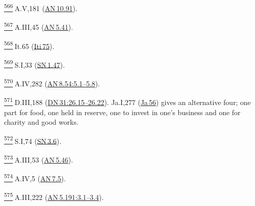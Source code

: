\label{footprints_split_025.html_fn566}
\hyperref[footprints_split_015.htmlux5cux23fnref566]{\textsuperscript{566}} A.V,181
(\href{https://suttacentral.net/an10.91/en/sujato}{AN\,10.91}).

\label{footprints_split_025.html_fn567}
\hyperref[footprints_split_015.htmlux5cux23fnref567]{\textsuperscript{567}} A.III,45
(\href{https://suttacentral.net/an5.41/en/sujato}{AN\,5.41}).

\label{footprints_split_025.html_fn568}
\hyperref[footprints_split_015.htmlux5cux23fnref568]{\textsuperscript{568}} It.65
(\href{https://suttacentral.net/iti75/en/sujato}{Iti\,75}).

\label{footprints_split_025.html_fn569}
\hyperref[footprints_split_015.htmlux5cux23fnref569]{\textsuperscript{569}} S.I,33
(\href{https://suttacentral.net/sn1.47/en/sujato}{SN\,1.47}).

\label{footprints_split_025.html_fn570}
\hyperref[footprints_split_015.htmlux5cux23fnref570]{\textsuperscript{570}} A.IV,282
(\href{https://suttacentral.net/an8.54/en/sujato\#5.1}{AN\,8.54:5.1--5.8}).

\label{footprints_split_025.html_fn571}
\hyperref[footprints_split_015.htmlux5cux23fnref571]{\textsuperscript{571}} D.III,188
(\href{https://suttacentral.net/dn31/en/sujato\#26.15}{DN\,31:26.15--26.22}).
Ja.I,277 (\href{https://suttacentral.net/ja56}{Ja\,56}) gives an
alternative four; one part for food, one held in reserve, one to invest
in one's business and one for charity and good works.

\label{footprints_split_025.html_fn572}
\hyperref[footprints_split_015.htmlux5cux23fnref572]{\textsuperscript{572}} S.I,74
(\href{https://suttacentral.net/sn3.6/en/sujato}{SN\,3.6}).

\label{footprints_split_025.html_fn573}
\hyperref[footprints_split_015.htmlux5cux23fnref573]{\textsuperscript{573}} A.III,53
(\href{https://suttacentral.net/an5.46/en/sujato}{AN\,5.46}).

\label{footprints_split_025.html_fn574}
\hyperref[footprints_split_015.htmlux5cux23fnref574]{\textsuperscript{574}} A.IV,5
(\href{https://suttacentral.net/an7.5/en/sujato}{AN\,7.5}).

\label{footprints_split_025.html_fn575}
\hyperref[footprints_split_015.htmlux5cux23fnref575]{\textsuperscript{575}} A.III,222
(\href{https://suttacentral.net/an5.191/en/sujato\#3.1}{AN\,5.191:3.1--3.4}).


